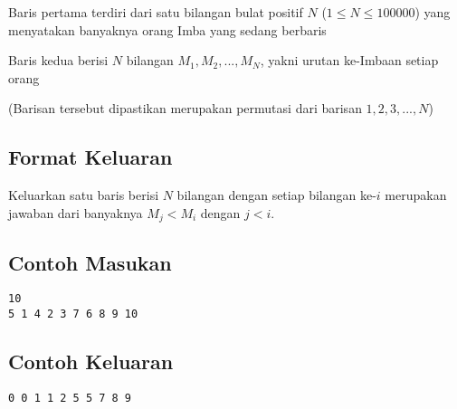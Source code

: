 \documentclass{article}
\begin{document}
Baris pertama terdiri dari satu bilangan bulat positif $N$ ($1 \leq N \leq 100000$) yang menyatakan banyaknya orang Imba yang sedang berbaris

Baris kedua berisi $N$ bilangan $M_1, M_2, ..., M_N$, yakni urutan ke-Imbaan setiap orang

(Barisan tersebut dipastikan merupakan permutasi dari barisan $1, 2, 3, ..., N$)

\subsection*{Format Keluaran}

Keluarkan satu baris berisi $N$ bilangan dengan setiap bilangan ke-$i$ merupakan jawaban dari banyaknya $M_j < M_i$ dengan $j < i$.

\begin{multicols}{2}
\subsection*{Contoh Masukan}
\begin{lstlisting}
10
5 1 4 2 3 7 6 8 9 10
\end{lstlisting}
\columnbreak
\subsection*{Contoh Keluaran}
\begin{lstlisting}
0 0 1 1 2 5 5 7 8 9
\end{lstlisting}
\vfill
\null
\end{multicols}


\pagebreak
\end{document}
